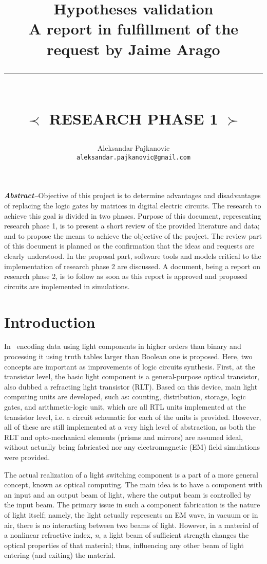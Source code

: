 \documentclass[12pt]{article}
\title{
	\LARGE Hypotheses validation \\ \smallskip
	\normalsize A report in fulfillment of the request by Jaime Arago \\ 
	\noindent\rule{\textwidth}{0.1pt} \\ \medskip
	\large $\prec$ RESEARCH PHASE 1 $\succ$
}
\author{Aleksandar Pajkanovic \\
\footnotesize \texttt{aleksandar.pajkanovic@gmail.com}}
\renewcommand\abstractname{\noindent\textbf{\textit{\small Abstract--}}}
\begin{document}
\maketitle

\abstractname{Objective of this project is to determine advantages and disadvantages of replacing the logic gates by matrices in digital electric circuits. The research to achieve this goal is divided in two phases. Purpose of this document, representing research phase 1, is to present a short review of the provided literature and data; and to propose the means to achieve the objective of the project. The review part of this document is planned as the confirmation that the ideas and requests are clearly understood. In the proposal part, software tools and models critical to the implementation of research phase 2 are discussed. A document, being a report on research phase 2, is to follow as soon as this report is approved and proposed circuits are implemented in simulations.}

\section{Introduction}
\label{intro}

In~\cite{Arago:2012} encoding data using light components in higher orders than binary and processing it using truth tables larger than Boolean one is proposed. Here, two concepts are important as improvements of logic circuits synthesis. First, at the transistor level, the basic light component is a general-purpose optical transistor, also dubbed a refracting light transistor (RLT). Based on this device, main light computing units are developed, such as: counting, distribution, storage, logic gates, and arithmetic-logic unit, which are all RTL units implemented at the transistor level, i.e. a circuit schematic for each of the units is provided. However, all of these are still implemented at a very high level of abstraction, as both the RLT and opto-mechanical elements (prisms and mirrors) are assumed ideal, without actually being fabricated nor any electromagnetic (EM) field simulations were provided.

The actual realization of a light switching component is a part of a more general concept, known as optical computing. The main idea is to have a component with an input and an output beam of light, where the output beam is controlled by the input beam. The primary issue in such a component fabrication is the nature of light itself; namely, the light actually represents an EM wave, in vacuum or in air, there is no interacting between two beams of light. However, in a material of a nonlinear refractive index, \textit{n}, a light beam of sufficient strength changes the optical properties of that material; thus, influencing any other beam of light entering (and exiting) the material. 
\end{document}
